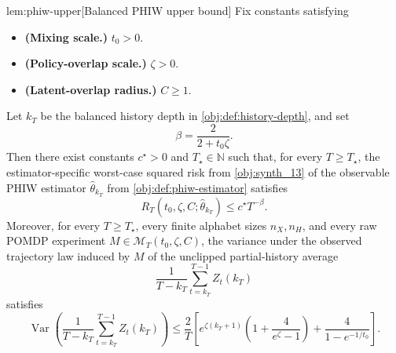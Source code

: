 \documentclass[11pt]{article}
\begin{document}
\begin{lemmav}{lem:phiw-upper}[Balanced PHIW upper bound]
Fix constants satisfying
\begin{itemize}
\item \textbf{(Mixing scale.)} \(t_0>0\).
\item \textbf{(Policy-overlap scale.)} \(\zeta>0\).
\item \textbf{(Latent-overlap radius.)} \(C\ge 1\).
\end{itemize}
Let \(k_T\) be the balanced history depth in \cref{obj:def:history-depth}, and set
\[
\beta=\frac{2}{2+t_0\zeta}.
\]
Then there exist constants \(c^\star>0\) and \(T_\star\in\mathbb N\) such that, for every \(T\ge T_\star\), the estimator-specific worst-case squared risk from \cref{obj:synth_13} of the observable PHIW estimator \(\widehat\theta_{k_T}\) from \cref{obj:def:phiw-estimator} satisfies
\[
R_T(t_0,\zeta,C;\widehat\theta_{k_T})
\le
c^\star T^{-\beta}.
\]
Moreover, for every \(T\ge T_\star\), every finite alphabet sizes \(n_X,n_H\), and every raw POMDP experiment \(M\in\mathcal M_T(t_0,\zeta,C)\), the variance under the observed trajectory law induced by \(M\) of the unclipped partial-history average
\[
\frac{1}{T-k_T}\sum_{t=k_T}^{T-1} Z_t(k_T)
\]
satisfies
\[
\operatorname{Var}
\!\left(\frac{1}{T-k_T}\sum_{t=k_T}^{T-1} Z_t(k_T)\right)
\le
\frac{2}{T}
\left[
e^{\zeta(k_T+1)}
\left(1+\frac{4}{e^\zeta-1}\right)
+
\frac{4}{1-e^{-1/t_0}}
\right].
\]
\end{lemmav}
\end{document}
